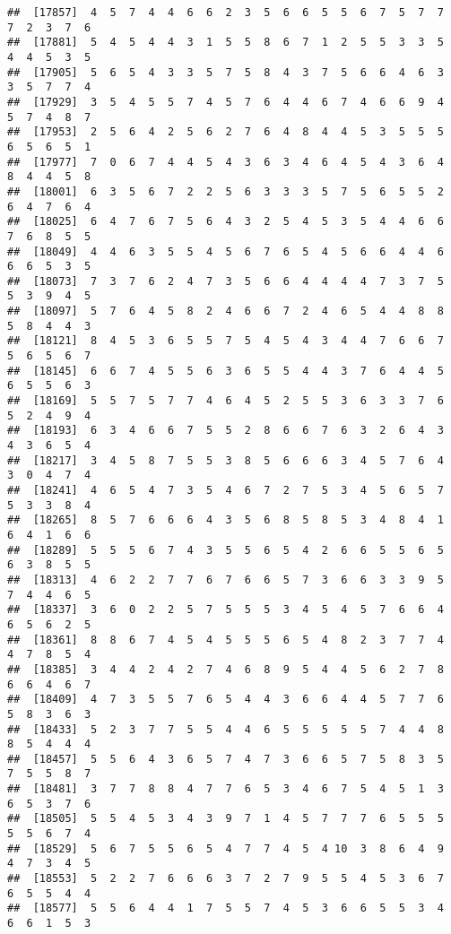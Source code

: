 \documentclass[
]{book}
\begin{document}
\begin{verbatim}
##  [17857]  4  5  7  4  4  6  6  2  3  5  6  6  5  5  6  7  5  7  7  7  2  3  7  6
##  [17881]  5  4  5  4  4  3  1  5  5  8  6  7  1  2  5  5  3  3  5  4  4  5  3  5
##  [17905]  5  6  5  4  3  3  5  7  5  8  4  3  7  5  6  6  4  6  3  3  5  7  7  4
##  [17929]  3  5  4  5  5  7  4  5  7  6  4  4  6  7  4  6  6  9  4  5  7  4  8  7
##  [17953]  2  5  6  4  2  5  6  2  7  6  4  8  4  4  5  3  5  5  5  6  5  6  5  1
##  [17977]  7  0  6  7  4  4  5  4  3  6  3  4  6  4  5  4  3  6  4  8  4  4  5  8
##  [18001]  6  3  5  6  7  2  2  5  6  3  3  3  5  7  5  6  5  5  2  6  4  7  6  4
##  [18025]  6  4  7  6  7  5  6  4  3  2  5  4  5  3  5  4  4  6  6  7  6  8  5  5
##  [18049]  4  4  6  3  5  5  4  5  6  7  6  5  4  5  6  6  4  4  6  6  6  5  3  5
##  [18073]  7  3  7  6  2  4  7  3  5  6  6  4  4  4  4  7  3  7  5  5  3  9  4  5
##  [18097]  5  7  6  4  5  8  2  4  6  6  7  2  4  6  5  4  4  8  8  5  8  4  4  3
##  [18121]  8  4  5  3  6  5  5  7  5  4  5  4  3  4  4  7  6  6  7  5  6  5  6  7
##  [18145]  6  6  7  4  5  5  6  3  6  5  5  4  4  3  7  6  4  4  5  6  5  5  6  3
##  [18169]  5  5  7  5  7  7  4  6  4  5  2  5  5  3  6  3  3  7  6  5  2  4  9  4
##  [18193]  6  3  4  6  6  7  5  5  2  8  6  6  7  6  3  2  6  4  3  4  3  6  5  4
##  [18217]  3  4  5  8  7  5  5  3  8  5  6  6  6  3  4  5  7  6  4  3  0  4  7  4
##  [18241]  4  6  5  4  7  3  5  4  6  7  2  7  5  3  4  5  6  5  7  5  3  3  8  4
##  [18265]  8  5  7  6  6  6  4  3  5  6  8  5  8  5  3  4  8  4  1  6  4  1  6  6
##  [18289]  5  5  5  6  7  4  3  5  5  6  5  4  2  6  6  5  5  6  5  6  3  8  5  5
##  [18313]  4  6  2  2  7  7  6  7  6  6  5  7  3  6  6  3  3  9  5  7  4  4  6  5
##  [18337]  3  6  0  2  2  5  7  5  5  5  3  4  5  4  5  7  6  6  4  6  5  6  2  5
##  [18361]  8  8  6  7  4  5  4  5  5  5  6  5  4  8  2  3  7  7  4  4  7  8  5  4
##  [18385]  3  4  4  2  4  2  7  4  6  8  9  5  4  4  5  6  2  7  8  6  6  4  6  7
##  [18409]  4  7  3  5  5  7  6  5  4  4  3  6  6  4  4  5  7  7  6  5  8  3  6  3
##  [18433]  5  2  3  7  7  5  5  4  4  6  5  5  5  5  5  7  4  4  8  8  5  4  4  4
##  [18457]  5  5  6  4  3  6  5  7  4  7  3  6  6  5  7  5  8  3  5  7  5  5  8  7
##  [18481]  3  7  7  8  8  4  7  7  6  5  3  4  6  7  5  4  5  1  3  6  5  3  7  6
##  [18505]  5  5  4  5  3  4  3  9  7  1  4  5  7  7  7  6  5  5  5  5  5  6  7  4
##  [18529]  5  6  7  5  5  6  5  4  7  7  4  5  4 10  3  8  6  4  9  4  7  3  4  5
##  [18553]  5  2  2  7  6  6  6  3  7  2  7  9  5  5  4  5  3  6  7  6  5  5  4  4
##  [18577]  5  5  6  4  4  1  7  5  5  7  4  5  3  6  6  5  5  3  4  6  6  1  5  3

\end{verbatim}
\end{document}
